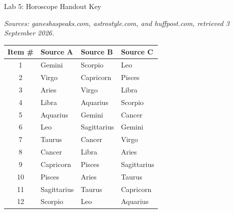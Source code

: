 \documentclass[11pt]{article}
\begin{document}
\begin{center}
\huge{Lab 5: Horoscope Handout Key}
\end{center}

\noindent\small\textit{Sources: ganeshaspeaks.com, astrostyle.com, and
huffpost.com, retrieved 3 September 2026. }
\normalsize

\begin{center}
\begin{tabular}{|c|l|l|l|}
\hline
\textbf{Item \#} & \textbf{Source A} & \textbf{Source B} & \textbf{Source C} \\
\hline
1 & Gemini & Scorpio & Leo \\
\hline
2 & Virgo & Capricorn & Pisces \\
\hline
3 & Aries & Virgo & Libra \\
\hline
4 & Libra & Aquarius & Scorpio \\
\hline
5 & Aquarius & Gemini & Cancer \\
\hline
6 & Leo & Sagittarius & Gemini \\
\hline
7 & Taurus & Cancer & Virgo \\
\hline
8 & Cancer & Libra & Aries \\
\hline
9 & Capricorn & Pisces & Sagittarius \\
\hline
10 & Pisces & Aries & Taurus \\
\hline
11 & Sagittarius & Taurus & Capricorn \\
\hline
12 & Scorpio & Leo & Aquarius \\
\hline
\end{tabular}
\end{center}

\bigskip
\end{document}
